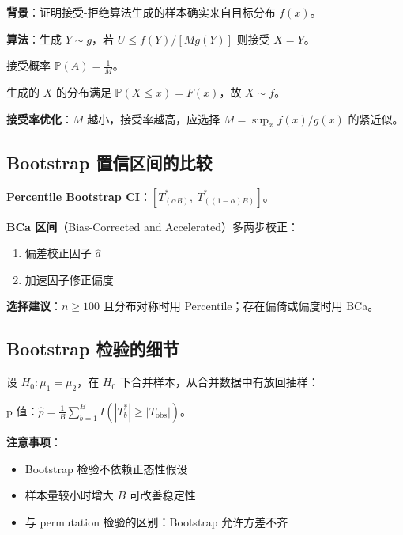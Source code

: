 \textbf{背景}：证明接受-拒绝算法生成的样本确实来自目标分布 $f(x)$。

\textbf{算法}：生成 $Y \sim g$，若 $U \leq f(Y)/[Mg(Y)]$ 则接受 $X=Y$。

接受概率 $\mathbb{P}(A) = \frac{1}{M}$。

生成的 $X$ 的分布满足 $\mathbb{P}(X \leq x) = F(x)$，故 $X \sim f$。

\textbf{接受率优化}：$M$ 越小，接受率越高，应选择 $M = \sup_x f(x)/g(x)$ 的紧近似。

\subsection{Bootstrap 置信区间的比较}\label{sec:derivation-bootstrap-ci}

\textbf{Percentile Bootstrap CI}：$\left[T_{(\alpha B)}^*,\ T_{((1-\alpha)B)}^*\right]$。

\textbf{BCa 区间}（Bias-Corrected and Accelerated）多两步校正：
\begin{enumerate}
\item 偏差校正因子 $\widehat{a}$
\item 加速因子修正偏度
\end{enumerate}

\textbf{选择建议}：$n \geq 100$ 且分布对称时用 Percentile；存在偏倚或偏度时用 BCa。

\subsection{Bootstrap 检验的细节}\label{sec:derivation-bootstrap-test}

设 $H_0: \mu_1 = \mu_2$，在 $H_0$ 下合并样本，从合并数据中有放回抽样：

p 值：$\hat{p} = \frac{1}{B}\sum_{b=1}^B I\!\left(|T_b^*| \geq |T_{\mathrm{obs}}|\right)$。

\textbf{注意事项}：
\begin{itemize}
\item Bootstrap 检验不依赖正态性假设
\item 样本量较小时增大 $B$ 可改善稳定性
\item 与 permutation 检验的区别：Bootstrap 允许方差不齐
\end{itemize}

